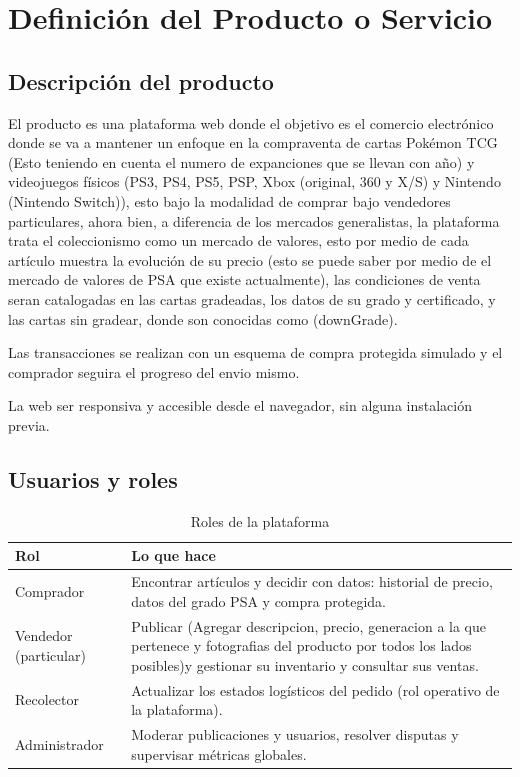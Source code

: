 \documentclass[letterpaper,11pt]{article}
\begin{document}
\newpage

\section{Definición del Producto o Servicio}
\subsection{Descripción del producto}


El producto es una plataforma web 
donde el objetivo es el comercio electrónico 
donde se va a mantener un enfoque en 
la compraventa de cartas Pokémon TCG (Esto teniendo en cuenta el numero 
de expanciones que se llevan con año) y videojuegos 
físicos (PS3, PS4, PS5, PSP, Xbox (original, 360 y X/S) y 
Nintendo (Nintendo Switch)), 
esto bajo la modalidad de comprar bajo vendedores particulares,
ahora bien, a diferencia de los mercados generalistas, la plataforma 
trata el coleccionismo como un mercado de valores, esto por medio 
de cada artículo muestra la evolución de su precio (esto se puede saber por medio de el mercado de valores de
PSA que existe actualmente), las condiciones de venta 
seran catalogadas en las cartas gradeadas, los datos de su grado y certificado, y las 
cartas sin gradear, donde son conocidas como (downGrade). 

Las transacciones se realizan con un esquema de compra protegida simulado 
y el comprador seguira el progreso del envio mismo.

La web ser responsiva y accesible desde el navegador, 
sin alguna instalación previa.

\subsection{Usuarios y roles}
\begin{table}[H]
\centering
\begin{tabularx}{\textwidth}{|l|Y|}
\hline
\textbf{Rol} & \textbf{Lo que hace} \\ \hline
Comprador & Encontrar artículos y decidir con datos: historial de precio, datos del grado PSA y compra protegida. \\ \hline
Vendedor (particular) & Publicar (Agregar descripcion, precio, generacion a la que pertenece y fotografias del producto por todos los lados posibles)y gestionar su inventario y consultar sus ventas. \\ \hline
Recolector & Actualizar los estados logísticos del pedido (rol operativo de la plataforma). \\ \hline
Administrador & Moderar publicaciones y usuarios, resolver disputas y supervisar métricas globales. \\ \hline
\end{tabularx}
\caption{Roles de la plataforma}
\end{table}
\end{document}
